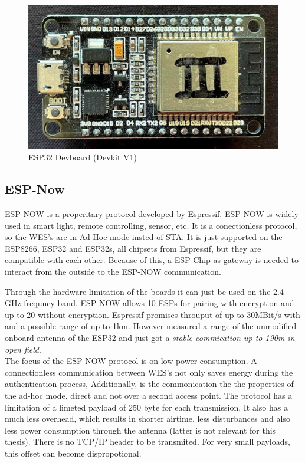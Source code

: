 \begin{figure}[h]
	\centering
	\includegraphics[scale=0.2]{figures/espdevboard.jpg}
	\caption{ESP32 Devboard (Devkit V1)}
	\label{fig:esp32}%
\end{figure}


\subsection{ESP-Now}
\label{sub:espnow}
ESP-NOW is a properitary protocol developed by Espressif. 
ESP-NOW is widely used in smart light, remote controlling, sensor, etc. 
It is a conectionless protocol, so the \ac{WES}'s are in Ad-Hoc mode insted of \ac{STA}.
It is just supported on the ESP8266, ESP32 and ESP32s, all chipsets from Espressif, but they are compatible with each other.
Because of this, a ESP-Chip as gateway is needed to interact from the outside to the ESP-NOW communication. 

Through the hardware limitation of the boards it can just be used on the 2.4 GHz frequncy band.
ESP-NOW allows 10 ESPs for pairing with encryption and up to 20 without encryption.
Espressif promises throuput of up to 30MBit/s with and a possible range of up to 1km.
However \emph{\textcite{ESPNOWPaper}} measured a range of the unmodified onboard antenna of the ESP32 
and just got a \emph{\textcite{ESPNOWPaper} stable commication up to 190m in open field}.\\

The focus of the ESP-NOW protocol is on low power consumption.
A connectionless communication between \ac{WES}'s not only saves energy during the authentication process, 
Additionally, is the commonication the the properties of the ad-hoc mode, direct and not over a second access point.
The protocol has a limitation of a limeted payload of 250 byte for each transmission.
It also has a much less overhead, which results in shorter airtime, less disturbances and also less power consumption through the antenna 
(latter is not relevant for this thesis).
There is no TCP/IP header to be transmited. 
For very small payloads, this offset can become dispropotional.

